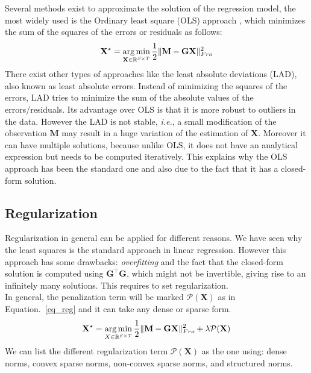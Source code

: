 Several methods exist to approximate the solution of the regression model, the most widely used is the Ordinary least square (OLS) approach \cite{legendre1805nouvelles}, which minimizes the sum of the squares of the errors or residuals as follows:
\begin{equation} \label{eq_ls}
	\mathbf{X^\star} = \mathop{\mathrm{arg}\,\mathrm{min}}_{\mathbf{X}\in \mathbb{R}^{S\times T}}\frac{1}{2} \|\mathbf{M}-\mathbf{GX}\|_{Fro}^2
\end{equation}
There exist other types of approaches like the least absolute deviations (LAD), also known as least absolute errors. Instead of minimizing the squares of the errors, LAD tries to minimize the sum of the absolute values of the errors/residuals. Its advantage over OLS is that it is more robust to outliers in the data. However the LAD is not stable, \textit{i.e.}, a small modification of the observation $\mathbf{M}$ may result in a huge variation of the estimation of $\mathbf{X}$. Moreover it can have multiple solutions, because unlike OLS, it does not have an analytical expression but needs to be computed iteratively. This explains why the OLS approach has been the standard one and also due to the fact that it has a closed-form solution.

\subsection{Regularization}

Regularization in general can be applied for different reasons. We have seen why the least squares is the standard approach in linear regression. However this approach has some drawbacks: \textit{overfitting} and the fact that the closed-form solution is computed using $\mathbf{G}^\top\mathbf{G}$, which might not be invertible, giving rise to an infinitely many solutions. This requires to set regularization.\\

In general, the penalization term will be marked $\mathcal{P}(\mathbf{X})$ as in Equation.~\eqref{eq_reg} and it can take any dense or sparse form.
\begin{equation} \label{eq_reg}
	\mathbf{X}^\star = \mathop{\mathrm{arg}\,\mathrm{min}}_{X\in\mathbb{R}^{S\times T}}\frac{1}{2}\|\mathbf{M}-\mathbf{GX}\|_{Fro}^2 + \lambda\mathcal{P}(\mathbf{X})
\end{equation}
We can list the different regularization term $\mathcal{P}(\mathbf{X})$ as the one using: dense norms, convex sparse norms, non-convex sparse norms, and structured norms.

